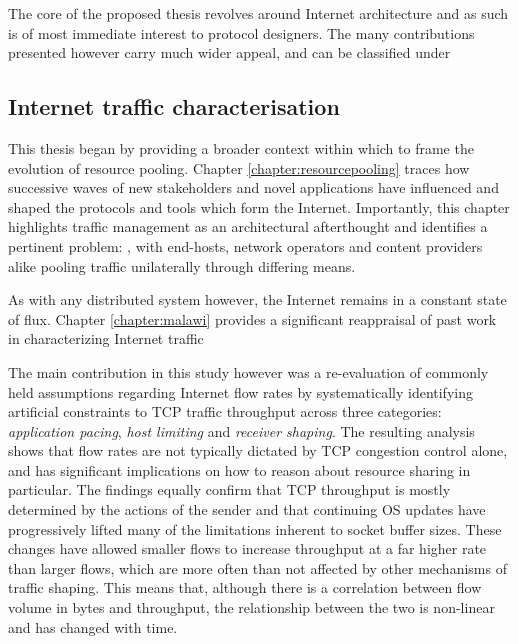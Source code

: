 The core of the proposed thesis revolves around Internet architecture and as such is of most immediate interest to protocol designers.
The many contributions presented however carry much wider appeal, and can be classified under 


\subsection{Internet traffic characterisation}

This thesis began by providing a broader context within which to frame the evolution of resource pooling.
Chapter \ref{chapter:resourcepooling} traces how successive waves of new stakeholders and novel applications have influenced and shaped the protocols and tools which form the Internet.
Importantly, this chapter highlights traffic management as an architectural afterthought and identifies a pertinent problem:
, with end-hosts, network operators and content providers alike pooling traffic unilaterally through differing means.


As with any distributed system however, the Internet remains in a constant state of flux.
\LOREM
Chapter \ref{chapter:malawi} provides a significant reappraisal of past work in characterizing Internet traffic

The main contribution in this study however was a re-evaluation of commonly held assumptions regarding Internet flow rates by systematically identifying artificial constraints to \ac{TCP} traffic throughput across three categories: \emph{application pacing}, \emph{host limiting} and \emph{receiver shaping}. 
The resulting analysis shows that flow rates are not typically dictated by \ac{TCP} congestion control alone, and has significant implications on how to reason about resource sharing in particular.
The findings equally confirm that \ac{TCP} throughput is mostly determined by the actions of the sender and that continuing \acf{OS} updates have progressively lifted many of the limitations inherent to socket buffer sizes. 
These changes have allowed smaller flows to increase throughput at a far higher rate than larger flows, which are more often than not affected by other mechanisms of traffic shaping.
This means that, although there is a correlation between flow volume in bytes and throughput, the relationship between the two is non-linear and has changed with time.

